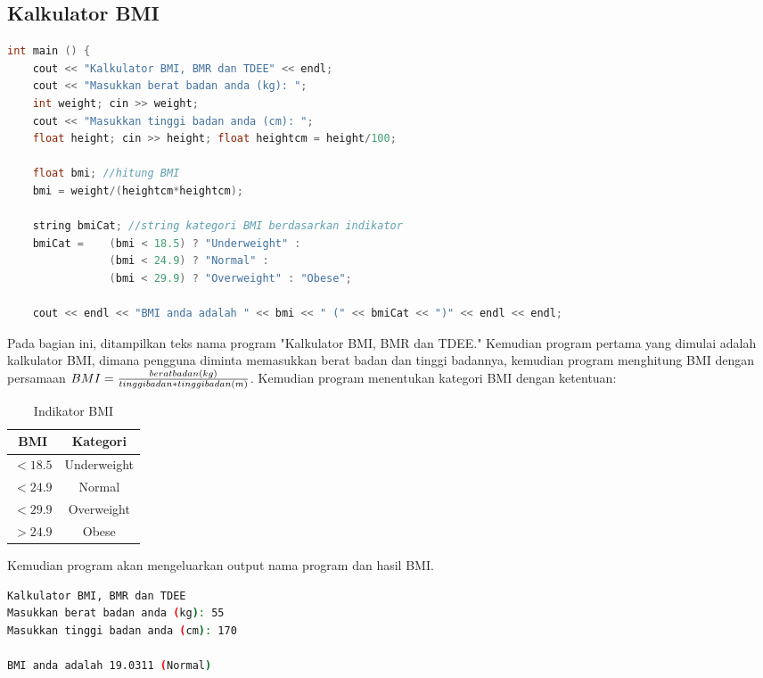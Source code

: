 \documentclass{article}
\begin{document}
\subsection{Kalkulator BMI}
\begin{lstlisting}[language=c++]
int main () {
    cout << "Kalkulator BMI, BMR dan TDEE" << endl;
    cout << "Masukkan berat badan anda (kg): ";
    int weight; cin >> weight;
    cout << "Masukkan tinggi badan anda (cm): ";
    float height; cin >> height; float heightcm = height/100;

    float bmi; //hitung BMI
    bmi = weight/(heightcm*heightcm);

    string bmiCat; //string kategori BMI berdasarkan indikator
    bmiCat =    (bmi < 18.5) ? "Underweight" :
                (bmi < 24.9) ? "Normal" :
                (bmi < 29.9) ? "Overweight" : "Obese";

    cout << endl << "BMI anda adalah " << bmi << " (" << bmiCat << ")" << endl << endl;
\end{lstlisting}
Pada bagian ini, ditampilkan teks nama program "Kalkulator BMI, BMR dan TDEE." Kemudian program pertama yang dimulai adalah kalkulator BMI, dimana pengguna diminta memasukkan berat badan dan tinggi badannya, kemudian program menghitung BMI dengan persamaan \(BMI=\frac{berat\space badan (kg)}{tinggi\space badan*tinggi\space badan(m)}\). Kemudian program menentukan kategori BMI dengan ketentuan: 
\begin{table}[]
    \centering
    \begin{tabular}{|c|c|} \hline 
         BMI&  Kategori\\ \hline 
           \(<18.5\)& 
    Underweight\\ \hline 
 \(<24.9\)&Normal\\ \hline 
 \(<29.9\)&Overweight\\ \hline 
 \(>24.9\)&Obese\\ \hline\end{tabular}
\caption{Indikator BMI}
\end{table}
Kemudian program akan mengeluarkan output nama program dan hasil BMI.
\begin{lstlisting}[language=bash]
Kalkulator BMI, BMR dan TDEE
Masukkan berat badan anda (kg): 55
Masukkan tinggi badan anda (cm): 170

BMI anda adalah 19.0311 (Normal)
    
\end{lstlisting}
\end{document}
